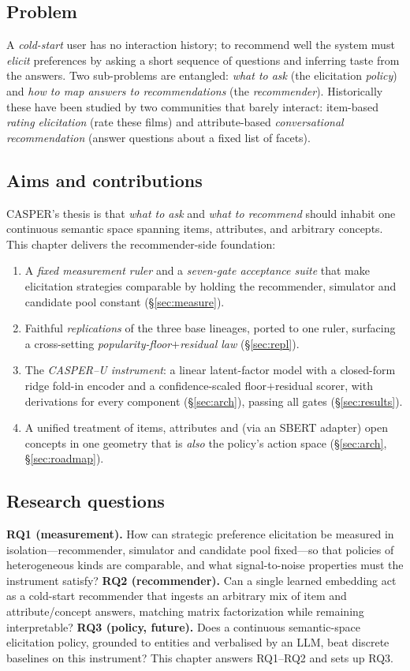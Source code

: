 \subsection{Problem}
A \emph{cold-start} user has no interaction history; to recommend well the system must \emph{elicit} preferences
by asking a short sequence of questions and inferring taste from the answers. Two sub-problems are entangled:
\emph{what to ask} (the elicitation \emph{policy}) and \emph{how to map answers to recommendations} (the
\emph{recommender}). Historically these have been studied by two communities that barely interact: item-based
\emph{rating elicitation} (rate these films) and attribute-based \emph{conversational recommendation} (answer
questions about a fixed list of facets).

\subsection{Aims and contributions}
CASPER's thesis is that \emph{what to ask} and \emph{what to recommend} should inhabit one continuous semantic
space spanning items, attributes, and arbitrary concepts. This chapter delivers the recommender-side foundation:
\begin{enumerate}[leftmargin=1.4em,itemsep=1pt]
  \item A \emph{fixed measurement ruler} and a \emph{seven-gate acceptance suite} that make elicitation strategies
        comparable by holding the recommender, simulator and candidate pool constant (\S\ref{sec:measure}).
  \item Faithful \emph{replications} of the three base lineages, ported to one ruler, surfacing a cross-setting
        \emph{popularity-floor$+$residual law} (\S\ref{sec:repl}).
  \item The \emph{CASPER--U instrument}: a linear latent-factor model with a closed-form ridge fold-in encoder
        and a confidence-scaled floor$+$residual scorer, with derivations for every component
        (\S\ref{sec:arch}), passing all gates (\S\ref{sec:results}).
  \item A unified treatment of items, attributes and (via an SBERT adapter) open concepts in one geometry that is
        \emph{also} the policy's action space (\S\ref{sec:arch}, \S\ref{sec:roadmap}).
\end{enumerate}

\subsection{Research questions}
\textbf{RQ1 (measurement).} How can strategic preference elicitation be measured in isolation---recommender,
simulator and candidate pool fixed---so that policies of heterogeneous kinds are comparable, and what
signal-to-noise properties must the instrument satisfy? \textbf{RQ2 (recommender).} Can a single learned
embedding act as a cold-start recommender that ingests an arbitrary mix of item and attribute/concept answers,
matching matrix factorization while remaining interpretable? \textbf{RQ3 (policy, future).} Does a continuous
semantic-space elicitation policy, grounded to entities and verbalised by an LLM, beat discrete baselines on this
instrument? This chapter answers RQ1--RQ2 and sets up RQ3.

